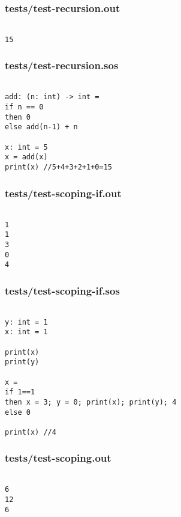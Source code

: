 \documentclass[main.tex]{subfiles}
\begin{document}
\subsubsection{tests/test-recursion.out}

\begin{lstlisting}

15
\end{lstlisting}

\subsubsection{tests/test-recursion.sos}

\begin{lstlisting}

add: (n: int) -> int = 
if n == 0
then 0
else add(n-1) + n

x: int = 5
x = add(x)
print(x) //5+4+3+2+1+0=15

\end{lstlisting}

\subsubsection{tests/test-scoping-if.out}

\begin{lstlisting}

1
1
3
0
4
\end{lstlisting}

\subsubsection{tests/test-scoping-if.sos}

\begin{lstlisting}

y: int = 1
x: int = 1

print(x)
print(y)

x = 
if 1==1
then x = 3; y = 0; print(x); print(y); 4
else 0

print(x) //4
\end{lstlisting}

\subsubsection{tests/test-scoping.out}

\begin{lstlisting}

6
12
6
\end{lstlisting}
\end{document}
